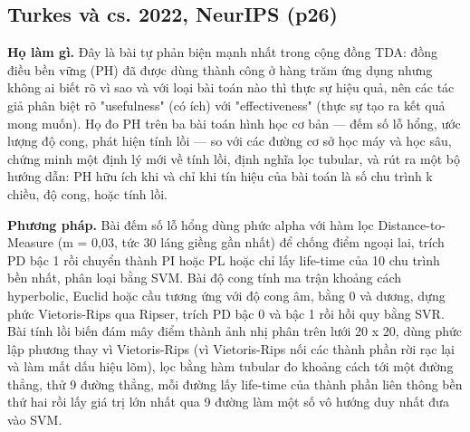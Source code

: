 \documentclass[12pt,a4paper]{article}
\begin{document}
\subsection{Turkes và cs. 2022, NeurIPS \normalfont\small (p26)}
\par\vspace{2pt}
\par\vspace{4pt}
\noindent \textbf{Họ làm gì.} Đây là bài tự phản biện mạnh nhất trong cộng đồng TDA: đồng điều bền vững (PH) đã được dùng thành công ở hàng trăm ứng dụng nhưng không ai biết rõ vì sao và với loại bài toán nào thì thực sự hiệu quả, nên các tác giả phân biệt rõ "usefulness" (có ích) với "effectiveness" (thực sự tạo ra kết quả mong muốn). Họ đo PH trên ba bài toán hình học cơ bản — đếm số lỗ hổng, ước lượng độ cong, phát hiện tính lồi — so với các đường cơ sở học máy và học sâu, chứng minh một định lý mới về tính lồi, định nghĩa lọc tubular, và rút ra một bộ hướng dẫn: PH hữu ích khi và chỉ khi tín hiệu của bài toán là số chu trình k chiều, độ cong, hoặc tính lồi.\par\vspace{3pt}
\noindent \textbf{Phương pháp.} Bài đếm số lỗ hổng dùng phức alpha với hàm lọc Distance-to-Measure (m = 0,03, tức 30 láng giềng gần nhất) để chống điểm ngoại lai, trích PD bậc 1 rồi chuyển thành PI hoặc PL hoặc chỉ lấy life-time của 10 chu trình bền nhất, phân loại bằng SVM. Bài độ cong tính ma trận khoảng cách hyperbolic, Euclid hoặc cầu tương ứng với độ cong âm, bằng 0 và dương, dựng phức Vietoris-Rips qua Ripser, trích PD bậc 0 và bậc 1 rồi hồi quy bằng SVR. Bài tính lồi biến đám mây điểm thành ảnh nhị phân trên lưới 20 x 20, dùng phức lập phương thay vì Vietoris-Rips (vì Vietoris-Rips nối các thành phần rời rạc lại và làm mất dấu hiệu lõm), lọc bằng hàm tubular đo khoảng cách tới một đường thẳng, thử 9 đường thẳng, mỗi đường lấy life-time của thành phần liên thông bền thứ hai rồi lấy giá trị lớn nhất qua 9 đường làm một số vô hướng duy nhất đưa vào SVM.\par\vspace{3pt}
\end{document}
